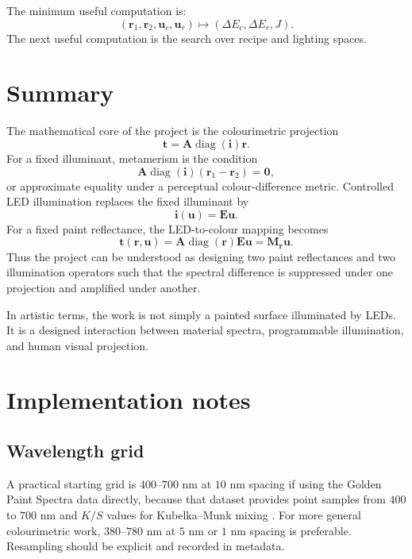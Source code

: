\documentclass[11pt,a4paper]{article}
\newcommand{\diag}{\operatorname{diag}}
\newcommand{\vect}[1]{\boldsymbol{#1}}
\newcommand{\mat}[1]{\mathbf{#1}}
\newcommand{\DE}{\Delta E}
\begin{document}
The minimum useful computation is:
\begin{equation}
 (\vect{r}_1,\vect{r}_2,\vect{u}_c,\vect{u}_r)
 \longmapsto
 (\DE_c,\DE_r,J).
\end{equation}
The next useful computation is the search over recipe and lighting spaces.

\section{Summary}

The mathematical core of the project is the colourimetric projection
\begin{equation}
 \vect{t}=\mat{A}\diag(\vect{i})\vect{r}.
\end{equation}
For a fixed illuminant, metamerism is the condition
\begin{equation}
 \mat{A}\diag(\vect{i})(\vect{r}_1-\vect{r}_2)=\vect{0},
\end{equation}
or approximate equality under a perceptual colour-difference metric. Controlled LED illumination replaces the fixed illuminant by
\begin{equation}
 \vect{i}(\vect{u})=\mat{E}\vect{u}.
\end{equation}
For a fixed paint reflectance, the LED-to-colour mapping becomes
\begin{equation}
 \vect{t}(\vect{r},\vect{u})=\mat{A}\diag(\vect{r})\mat{E}\vect{u}=\mat{M}_{\vect{r}}\vect{u}.
\end{equation}
Thus the project can be understood as designing two paint reflectances and two illumination operators such that the spectral difference is suppressed under one projection and amplified under another.

In artistic terms, the work is not simply a painted surface illuminated by LEDs. It is a designed interaction between material spectra, programmable illumination, and human visual projection.

\appendix

\section{Implementation notes}

\subsection{Wavelength grid}

A practical starting grid is $400$--$700$ nm at $10$ nm spacing if using the Golden Paint Spectra data directly, because that dataset provides point samples from $400$ to $700$ nm and $K/S$ values for Kubelka--Munk mixing \citep{GoldenSpectra}. For more general colourimetric work, $380$--$780$ nm at $5$ nm or $1$ nm spacing is preferable. Resampling should be explicit and recorded in metadata.
\end{document}
